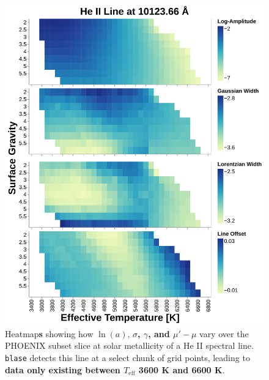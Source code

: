 \documentclass[twocolumn, linenumbers]{aastex631}
\begin{document}
\begin{figure}
    \centering
    \includegraphics[width=\columnwidth]{figure4}
    \caption{Heatmap\textbf{s} showing how $\ln(a)$, $\sigma$\textbf{, $\gamma$, and $\mu' - \mu$} vary over the PHOENIX subset slice at solar metallicity of a He II spectral line.
    \texttt{blase} detects this line at a select chunk of grid points, leading to \textbf{data only existing between $T_\text{eff}$ 3600 K and 6600 K}.}
    \label{fig:figure4}
\end{figure}
\end{document}
